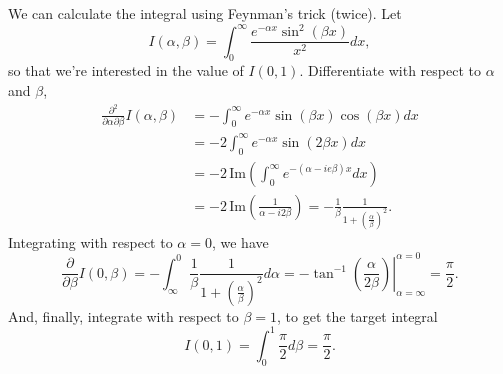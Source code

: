 We can calculate the integral using Feynman's trick (twice).
Let
\begin{equation*}
    I(\alpha, \beta) = \int_0^{\infty} \frac{e^{-\alpha x} \sin^2(\beta x)}{x^2} dx,
\end{equation*}
so that we're interested in the value of $I(0, 1)$.
Differentiate with respect to $\alpha$ and $\beta$,
\begin{equation*}
    \begin{split}
        \frac{\partial^2}{\partial\alpha \partial\beta} I(\alpha, \beta)
            &= - \int_0^{\infty} e^{-\alpha x} \sin(\beta x)\cos(\beta x) dx \\
            &= - 2 \int_0^{\infty} e^{-\alpha x} \sin(2\beta x) dx \\
            &= -2\, \mathrm{Im}\left( \int_0^{\infty} e^{-(\alpha - ie\beta)x} dx \right) \\
            &= -2\, \mathrm{Im}\left( \frac{1}{\alpha - i2\beta} \right)
            = -\frac{1}{\beta} \frac{1}{1 + (\frac{\alpha}{\beta})^2}.
    \end{split}
\end{equation*}
Integrating with respect to $\alpha = 0$, we have
\begin{equation*}
    \frac{\partial}{\partial \beta} I(0, \beta)
        = -\int_{\infty}^0 \frac{1}{\beta} \frac{1}{1 + (\frac{\alpha}{\beta})^2} d\alpha
        = \left. -\tan^{-1}\left(\frac{\alpha}{2\beta}\right) \right|_{\alpha=\infty}^{\alpha=0}
        = \frac{\pi}{2}.
\end{equation*}
And, finally, integrate with respect to $\beta = 1$, to get the target integral
\begin{equation*}
    I(0, 1) = \int_0^1 \frac{\pi}{2} d\beta = \frac{\pi}{2}.
\end{equation*}


